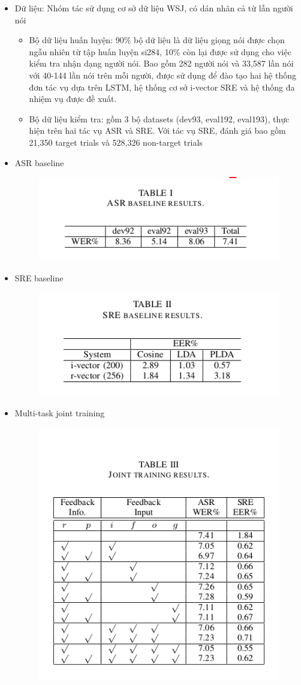 \documentclass{article}
\begin{document}
	\begin{itemize}
		\item Dữ liệu: Nhóm tác sử dụng cơ sở dữ liệu WSJ, có dán nhãn cả từ lẫn người nói
		\begin{itemize}
			\item Bộ dữ liệu huấn luyện: 90\% bộ dữ liệu là dữ liệu giọng nói được chọn ngẫu nhiên từ tập huấn luyện si284, 10\% còn lại được sử dụng cho việc kiểm tra nhận dạng người nói. Bao gồm 282 người nói và 33,587 lần nói với 40-144 lần nói trên mỗi người, được sử dụng để đào tạo hai hệ thống đơn tác vụ dựa trên LSTM, hệ thống cơ sở i-vector SRE và hệ thống đa nhiệm vụ được đề xuất.
			\item Bộ dữ liệu kiểm tra: gồm 3 bộ datasets (dev93, eval192, eval193), thực hiện trên hai tác vụ ASR và SRE. Với tác vụ SRE, đánh giá bao gồm 21,350 target trials và 528,326 non-target trials
		\end{itemize}
		\item ASR baseline
		\begin{figure}[H]
			\centering
			\includegraphics[width=0.5\linewidth]{images/multi-task-recurrent-model-asr-baseline-res.png}
			\label{fig:writing-thesis}
		\end{figure}
		\item SRE baseline
		\begin{figure}[H]
			\centering
			\includegraphics[width=0.5\linewidth]{images/multi-task-recurrent-model-sre-baseline-res.png}
			\label{fig:writing-thesis}
		\end{figure}
		\item Multi-task joint training
		\begin{figure}[H]
			\centering
			\includegraphics[width=0.5\linewidth]{images/multi-task-recurrent-model-joint-training-res.png}
			\label{fig:writing-thesis}
		\end{figure}
	\end{itemize}
\end{document}
